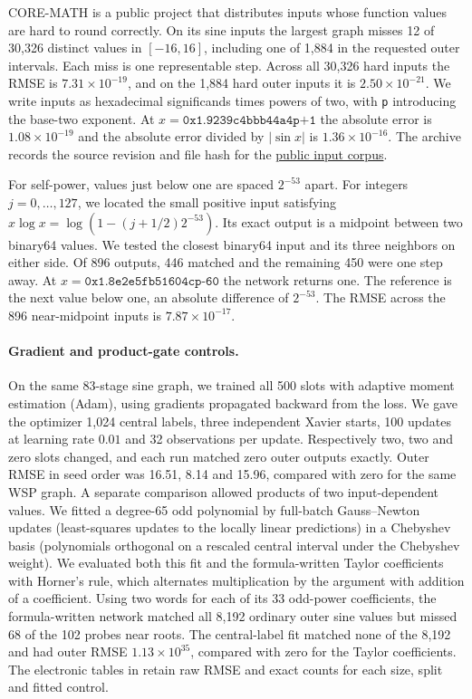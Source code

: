 CORE-MATH is a public project that distributes inputs whose function values are hard to round correctly. On its sine inputs the largest graph misses 12 of 30,326 distinct values in $[-16,16]$, including one of 1,884 in the requested outer intervals. Each miss is one representable step. Across all 30,326 hard inputs the RMSE is $7.31\times10^{-19}$, and on the 1,884 hard outer inputs it is $2.50\times10^{-21}$. We write inputs as hexadecimal significands times powers of two, with \texttt{p} introducing the base-two exponent. At $x=\texttt{0x1.9239c4bbb44a4p+1}$ the absolute error is $1.08\times10^{-19}$ and the absolute error divided by $|\sin x|$ is $1.36\times10^{-16}$. The archive records the source revision and file hash for the \href{https://core-math.gitlabpages.inria.fr/worst.html}{public input corpus}.

For self-power, values just below one are spaced $2^{-53}$ apart. For integers $j=0,\ldots,127$, we located the small positive input satisfying $x\log x=\log(1-(j+1/2)2^{-53})$. Its exact output is a midpoint between two binary64 values. We tested the closest binary64 input and its three neighbors on either side. Of 896 outputs, 446 matched and the remaining 450 were one step away. At $x=\texttt{0x1.8e2e5fb51604cp-60}$ the network returns one. The reference is the next value below one, an absolute difference of $2^{-53}$. The RMSE across the 896 near-midpoint inputs is $7.87\times10^{-17}$.

\paragraph{Gradient and product-gate controls.}
On the same 83-stage sine graph, we trained all 500 slots with adaptive moment estimation (Adam), using gradients propagated backward from the loss. We gave the optimizer 1,024 central labels, three independent Xavier starts, 100 updates at learning rate $0.01$ and 32 observations per update. Respectively two, two and zero slots changed, and each run matched zero outer outputs exactly. Outer RMSE in seed order was 16.51, 8.14 and 15.96, compared with zero for the same WSP graph. A separate comparison allowed products of two input-dependent values. We fitted a degree-65 odd polynomial by full-batch Gauss--Newton updates (least-squares updates to the locally linear predictions) in a Chebyshev basis (polynomials orthogonal on a rescaled central interval under the Chebyshev weight). We evaluated both this fit and the formula-written Taylor coefficients with Horner's rule, which alternates multiplication by the argument with addition of a coefficient. Using two words for each of its 33 odd-power coefficients, the formula-written network matched all 8,192 ordinary outer sine values but missed 68 of the 102 probes near roots. The central-label fit matched none of the 8,192 and had outer RMSE $1.13\times10^{35}$, compared with zero for the Taylor coefficients. The electronic tables in  retain raw RMSE and exact counts for each size, split and fitted control.
